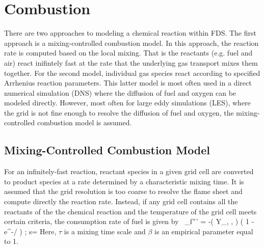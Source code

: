 \chapter{Combustion}

\label{combustionsection}

There are two approaches to modeling a chemical reaction within FDS.  The first approach is a mixing-controlled combustion model.  In this approach, the reaction rate is computed based on the local mixing.  That is the reactants (e.g. fuel and air) react inifintely fast at the rate that the underlying gas transport mixes them together.  For the second model, individual gas species react according to
specified Arrhenius reaction parameters. This latter model is most often used in a
direct numerical simulation (DNS) where the diffusion of fuel and oxygen can be
modeled directly.
However, most often for large eddy simulations (LES), where the grid is not
fine enough to resolve the diffusion of fuel and oxygen,
the mixing-controlled combustion model is assumed.

\section{Mixing-Controlled Combustion Model}

For an infinitely-fast reaction, reactant species in a given grid cell are converted to product species at a rate determined by a
characteristic mixing time.  It is assumed that the
grid resolution is too coarse to resolve the flame sheet and compute directly the reaction rate.  Instead, if any grid cell contains all the reactants of the the chemical reaction and the temperature of the grid cell meets certain criteria, the consumption rate of fuel is given by~\cite{Poinsot:TNC}
\be \dm_f''' = -\rho \min \left( Y_\F , , \beta {} \right) \; \left( 1 - e^{-\dt/\tau} \right)   \quad ; \quad
   s=  \label{EDC} \ee
Here, $\tau$ is a mixing time scale and $\beta$ is an empirical parameter equal to 1.

